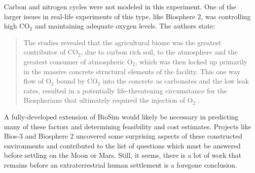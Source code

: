 Carbon and nitrogen cycles were not modeled in this experiment. One of the larger issues in real-life experiments of this type, like Biosphere 2, was controlling high CO$_2$ and maintaining adequate oxygen levels. The authors state:
\begin{quote}
    The studies revealed that the agricultural biome was the greatest contributor of CO$_2$, due to carbon rich soil, to the atmosphere and the greatest consumer of atmospheric O$_2$, which was then locked up primarily in the massive concrete structural elements of the facility. This one way flow of O$_2$ bound by CO$_2$ into the concrete as carbonates and the low leak rates, resulted in a potentially life-threatening circumstance for the Biospherians that ultimately required the injection of O$_2$ \cite{biosphere_intro}.
\end{quote}

A fully-developed extension of BioSim would likely be necessary in predicting many of these factors and determining feasibility and cost estimates. Projects like Bios-3 and Biosphere 2 uncovered some surprising aspects of these constructed environments and contributed to the list of questions which must be answered before settling on the Moon or Mars. Still, it seems, there is a lot of work that remains before an extraterrestrial human settlement is a foregone conclusion.